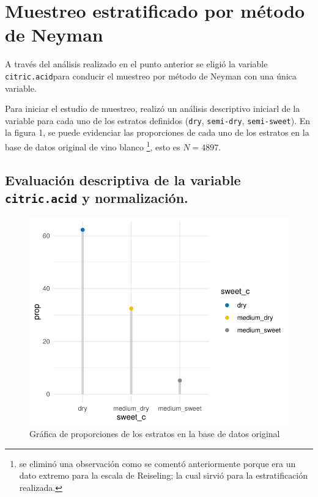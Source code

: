 \documentclass[
]{article}
\begin{document}
\hypertarget{muestreo-estratificado-por-muxe9todo-de-neyman}{%
\section{Muestreo estratificado por método de
Neyman}\label{muestreo-estratificado-por-muxe9todo-de-neyman}}

A través del análisis realizado en el punto anterior se eligió la
variable \texttt{citric.acid}para conducir el muestreo por método de
Neyman con una única variable.

Para iniciar el estudio de muestreo, realizó un análisis descriptivo
iniciarl de la variable para cada uno de los estratos definidos
(\texttt{dry}, \texttt{semi-dry}, \texttt{semi-sweet}). En la figura 1,
se puede evidenciar las proporciones de cada uno de los estratos en la
base de datos original de vino blanco \footnote{se eliminó una
  observación como se comentó anteriormente porque era un dato extremo
  para la escala de Reiseling; la cual sirvió para la estratificación
  realizada.}, esto es \(N = 4897\).

\hypertarget{evaluaciuxf3n-descriptiva-de-la-variable-citric.acid-y-normalizaciuxf3n.}{%
\subsection{\texorpdfstring{Evaluación descriptiva de la variable
\texttt{citric.acid} y
normalización.}{Evaluación descriptiva de la variable citric.acid y normalización.}}\label{evaluaciuxf3n-descriptiva-de-la-variable-citric.acid-y-normalizaciuxf3n.}}

\begin{figure}
\centering
\includegraphics{muestreo_estratificado_final_files/figure-latex/proportion untidy-1.pdf}
\caption{Gráfica de proporciones de los estratos en la base de datos
original}
\end{figure}
\end{document}
